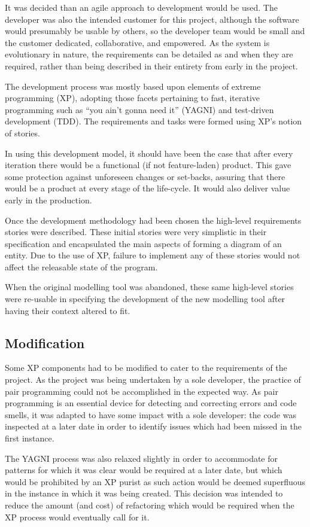 It was decided than an agile approach to development would be used. The developer was also the intended customer for this project, although the software would presumably be usable by others, so the developer team would be small and the customer dedicated, collaborative, and empowered. As the system is evolutionary in nature, the requirements can be detailed as and when they are required, rather than being described in their entirety from early in the project.

The development process was mostly based upon elements of extreme programming (XP), adopting those facets pertaining to fast, iterative programming such as ``you ain't gonna need it'' (YAGNI) and test-driven development (TDD). The requirements and tasks were formed using XP's notion of stories.

In using this development model, it should have been the case that after every iteration there would be a functional (if not feature-laden) product. This gave some protection against unforeseen changes or set-backs, assuring that there would be a product at every stage of the life-cycle. It would also deliver value early in the production.

Once the development methodology had been chosen the high-level requirements stories were described. These initial stories were very simplistic in their specification and encapsulated the main aspects of forming a diagram of an entity. Due to the use of XP, failure to implement any of these stories would not affect the releasable state of the program.

When the original modelling tool was abandoned, these same high-level stories were re-usable in specifying the development of the new modelling tool after having their context altered to fit.

\subsection*{Modification}
Some XP components had to be modified to cater to the requirements of the project. As the project was being undertaken by a sole developer, the practice of pair programming could not be accomplished in the expected way. As pair programming is an essential device for detecting and correcting errors and code smells, it was adapted to have some impact with a sole developer: the code was inspected at a later date in order to identify issues which had been missed in the first instance.

The YAGNI process was also relaxed slightly in order to accommodate for patterns for which it was clear would be required at a later date, but which would be prohibited by an XP purist as such action would be deemed superfluous in the instance in which it was being created. This decision was intended to reduce the amount (and cost) of refactoring which would be required when the XP process would eventually call for it.

